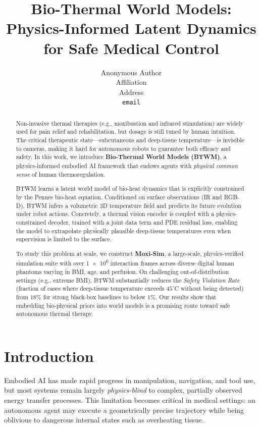 \documentclass{article}
\title{Bio-Thermal World Models:\\
Physics-Informed Latent Dynamics for Safe Medical Control}
\author{%
  Anonymous Author \\
  Affiliation \\
  Address \\
  \texttt{email} \\
}
\date{}
\begin{document}
\maketitle

\begin{abstract}
Non-invasive thermal therapies (e.g., moxibustion and infrared stimulation) are widely used for pain relief and rehabilitation, but dosage is still tuned by human intuition. The critical therapeutic state---subcutaneous and deep-tissue temperature---is invisible to cameras, making it hard for autonomous robots to guarantee both efficacy and safety. In this work, we introduce \textbf{Bio-Thermal World Models (BTWM)}, a physics-informed embodied AI framework that endows agents with \emph{physical common sense} of human thermoregulation.

BTWM learns a latent world model of bio-heat dynamics that is explicitly constrained by the Pennes bio-heat equation. Conditioned on surface observations (IR and RGB-D), BTWM infers a volumetric 3D temperature field and predicts its future evolution under robot actions. Concretely, a thermal vision encoder is coupled with a physics-constrained decoder, trained with a joint data term and PDE residual loss, enabling the model to extrapolate physically plausible deep-tissue temperatures even when supervision is limited to the surface.

To study this problem at scale, we construct \textbf{Moxi-Sim}, a large-scale, physics-verified simulation suite with over \num{1e6} interaction frames across diverse digital human phantoms varying in BMI, age, and perfusion. On challenging out-of-distribution settings (e.g., extreme BMI), BTWM substantially reduces the \emph{Safety Violation Rate} (fraction of cases where deep-tissue temperature exceeds $45^\circ$C without being detected) from $18\%$ for strong black-box baselines to below $1\%$. Our results show that embedding bio-physical priors into world models is a promising route toward safe autonomous thermal therapy.
\end{abstract}

\section{Introduction}
\label{sec:intro}

Embodied AI has made rapid progress in manipulation, navigation, and tool use, but most systems remain largely \emph{physics-blind} to complex, partially observed energy transfer processes. This limitation becomes critical in medical settings: an autonomous agent may execute a geometrically precise trajectory while being oblivious to dangerous internal states such as overheating tissue.
\end{document}

